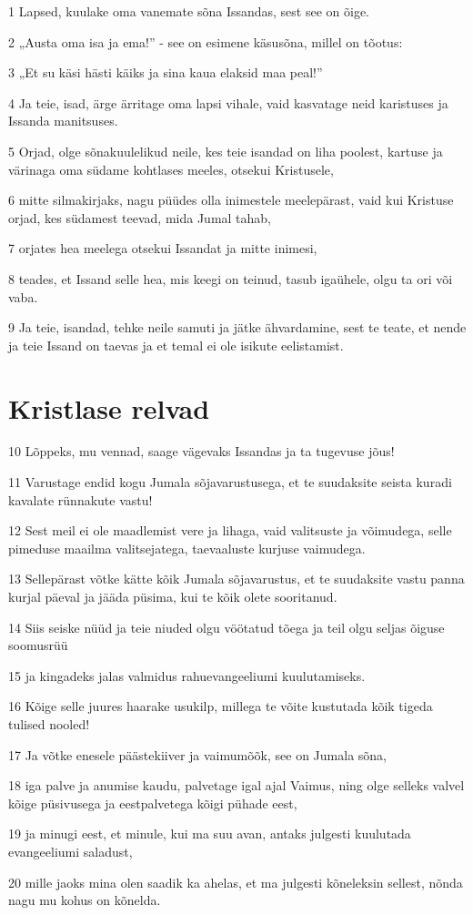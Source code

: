 \par 1 Lapsed, kuulake oma vanemate sõna Issandas, sest see on õige.
\par 2 „Austa oma isa ja ema!” - see on esimene käsusõna, millel on tõotus:
\par 3 „Et su käsi hästi käiks ja sina kaua elaksid maa peal!”
\par 4 Ja teie, isad, ärge ärritage oma lapsi vihale, vaid kasvatage neid karistuses ja Issanda manitsuses.
\par 5 Orjad, olge sõnakuulelikud neile, kes teie isandad on liha poolest, kartuse ja värinaga oma südame kohtlases meeles, otsekui Kristusele,
\par 6 mitte silmakirjaks, nagu püüdes olla inimestele meelepärast, vaid kui Kristuse orjad, kes südamest teevad, mida Jumal tahab,
\par 7 orjates hea meelega otsekui Issandat ja mitte inimesi,
\par 8 teades, et Issand selle hea, mis keegi on teinud, tasub igaühele, olgu ta ori või vaba.
\par 9 Ja teie, isandad, tehke neile samuti ja jätke ähvardamine, sest te teate, et nende ja teie Issand on taevas ja et temal ei ole isikute eelistamist.

\section*{Kristlase relvad}

\par 10 Lõppeks, mu vennad, saage vägevaks Issandas ja ta tugevuse jõus!
\par 11 Varustage endid kogu Jumala sõjavarustusega, et te suudaksite seista kuradi kavalate rünnakute vastu!
\par 12 Sest meil ei ole maadlemist vere ja lihaga, vaid valitsuste ja võimudega, selle pimeduse maailma valitsejatega, taevaaluste kurjuse vaimudega.
\par 13 Sellepärast võtke kätte kõik Jumala sõjavarustus, et te suudaksite vastu panna kurjal päeval ja jääda püsima, kui te kõik olete sooritanud.
\par 14 Siis seiske nüüd ja teie niuded olgu vöötatud tõega ja teil olgu seljas õiguse soomusrüü
\par 15 ja kingadeks jalas valmidus rahuevangeeliumi kuulutamiseks.
\par 16 Kõige selle juures haarake usukilp, millega te võite kustutada kõik tigeda tulised nooled!
\par 17 Ja võtke enesele päästekiiver ja vaimumõõk, see on Jumala sõna,
\par 18 iga palve ja anumise kaudu, palvetage igal ajal Vaimus, ning olge selleks valvel kõige püsivusega ja eestpalvetega kõigi pühade eest,
\par 19 ja minugi eest, et minule, kui ma suu avan, antaks julgesti kuulutada evangeeliumi saladust,
\par 20 mille jaoks mina olen saadik ka ahelas, et ma julgesti kõneleksin sellest, nõnda nagu mu kohus on kõnelda.


